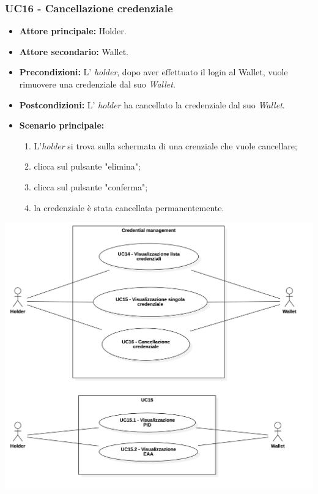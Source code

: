 \subsubsection{UC16 - Cancellazione credenziale}
\begin{itemize}
\item \textbf{Attore principale:} Holder.
\item \textbf{Attore secondario:} Wallet.
\item \textbf{Precondizioni:} L' \textit{holder}, dopo aver effettuato il login al Wallet, vuole rimuovere una credenziale dal suo \textit{Wallet}.
\item \textbf{Postcondizioni:} L' \textit{holder} ha cancellato la credenziale dal suo \textit{Wallet}.
\item \textbf{Scenario principale:} 
    \begin{enumerate}
    \item L'\textit{holder} si trova sulla schermata di una crenziale che vuole cancellare; 
    \item clicca sul pulsante "elimina"; 
    \item clicca sul pulsante "conferma"; 
    \item la credenziale è stata cancellata permanentemente.
    \end{enumerate}
\end{itemize}

\begin{center}
    \includegraphics[scale = 0.3]{./res/img/CredentialManagement.png}
  \end{center}

